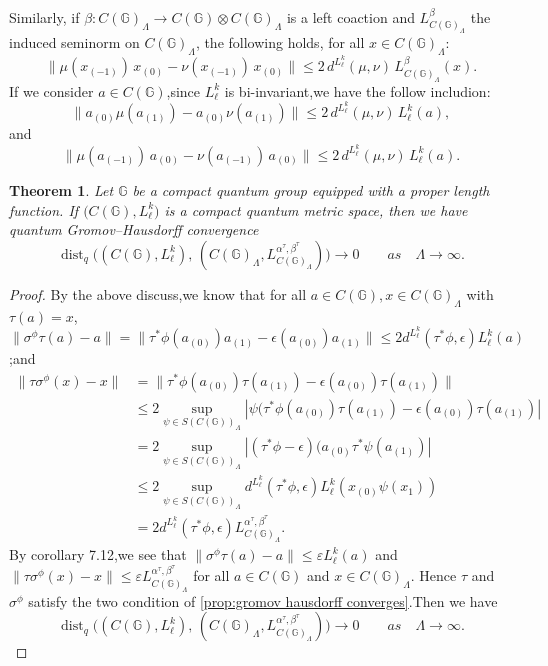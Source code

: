 \documentclass[12pt, reqno]{amsart}
\newtheorem{theorem}{Theorem}[section]
\theoremstyle{definition}
\theoremstyle{remark}
\numberwithin{equation}{section}
\begin{document}
Similarly, if \( \beta: {C(\mathbb{G})_\Lambda} \to C(\mathbb{G}) \otimes {C(\mathbb{G})_\Lambda} \) is a left coaction and \( L_{C(\mathbb{G})_\Lambda}^\beta \) the induced seminorm on \( {C(\mathbb{G})_\Lambda} \), the following holds, for all \( x \in {C(\mathbb{G})_\Lambda} \):
\[
\| \mu(x_{(-1)}) \, x_{(0)} - \nu(x_{(-1)}) \, x_{(0)} \| \leq 2 \, d^{L_\ell^k}(\mu, \nu) \, L_{C(\mathbb{G})_\Lambda}^\beta(x).
\]
 If we consider $a\in C(\mathbb{G})$,since $L_\ell^k$ is bi-invariant,we have the follow includion:
 \[
\| a_{(0)}\mu(a_{(1)}) - a_{(0)}\nu(a_{(1)}) \| \leq 2 \, d^{L_\ell^k}(\mu, \nu) \, L_\ell^k(a),
\]
and
\[
\| \mu(a_{(-1)}) \, a_{(0)} - \nu(a_{(-1)}) \, a_{(0)} \| \leq 2 \, d^{L_\ell^k}(\mu, \nu) \, L_\ell^k(a).
\]



\begin{theorem}\label{theorem Gromov Hausdorff}
Let \(\mathbb{G}\) be a compact quantum group equipped with a proper length 
function. If \(\bigl(C(\mathbb{G}), L_\ell^k\bigr)\) is a compact quantum 
metric space, then  we have quantum 
Gromov--Hausdorff convergence
\[
\operatorname{dist}_q\bigl((C(\mathbb{G}),L_{\ell}^k),\, 
(C(\mathbb{G})_\Lambda, L_{C(\mathbb{G})_\Lambda}^{\alpha^{\tau},\beta^{\tau}})\bigr) \to 0 \qquad as \quad\Lambda\to \infty.
\]
\end{theorem}
\begin{proof}
By the above discuss,we know that for all $a\in C(\mathbb{G}),x\in C(\mathbb{G})_\Lambda$ with $\tau(a)=x$,
$\|\sigma^{\phi}\tau(a)-a\|=\|\tau^*\phi(a_{(0)})a_{(1)}-\epsilon(a_{(0)})a_{(1)}\|\leq 2d^{L_\ell^k}(\tau^*\phi,\epsilon)L_\ell^k(a)$;and
\begin{align*}
    \|\tau\sigma^{\phi}(x)-x\|&=\|\tau^*\phi(a_{(0)})\tau(a_{(1)})-\epsilon(a_{(0)})\tau(a_{(1)})\|\\
    &\leq 2\sup_{\psi\in S(C(\mathbb{G}))_\Lambda}|\psi(\tau^*\phi(a_{(0)})\tau(a_{(1)})-\epsilon(a_{(0)})\tau(a_{(1)})|\\
    &=2\sup_{\psi\in S(C(\mathbb{G}))_\Lambda}|(\tau^*\phi-\epsilon)(a_{(0)}\tau^*\psi(a_{(1)})|\\
    &\leq 2\sup_{\psi\in S(C(\mathbb{G}))_\Lambda}d^{L_\ell^k}(\tau^*\phi,\epsilon)L_\ell^k(x_{(0)}\psi(x_{1}))\\
    &=2d^{L_\ell^k}(\tau^*\phi,\epsilon)L_{C(\mathbb{G})_\Lambda}^{\alpha^{\tau},\beta^{\tau}}.
\end{align*}
By \cite{6} corollary 7.12,we see that $\|\sigma^{\phi}\tau(a)-a\|\leq \varepsilon L_\ell^k(a)$ and $\|\tau\sigma^{\phi}(x)-x\|\leq \varepsilon L_{C(\mathbb{G})_\Lambda}^{\alpha^{\tau},\beta^{\tau}}$ for all $a\in C(\mathbb{G})$ and $x\in C(\mathbb{G})_\Lambda$.
Hence $\tau$ and $\sigma^\phi$ satisfy the two condition of \ref{prop:gromov hausdorff converges}.Then we have 
\[
\operatorname{dist}_q\bigl((C(\mathbb{G}),L_{\ell}^k),\, 
(C(\mathbb{G})_\Lambda, L_{C(\mathbb{G})_\Lambda}^{\alpha^{\tau},\beta^{\tau}})\bigr) \to 0 \qquad as \quad\Lambda\to \infty.
\]
\end{proof}
\end{document}
